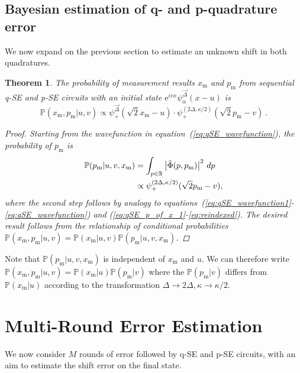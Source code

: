 \documentclass[prx,reprint,superscriptaddress,longbibliography,floatfix,nofootinbib]{revtex4-1}
\newtheorem{theorem}{Theorem}
\begin{document}
\subsection{Bayesian estimation of q- and p-quadrature error}
We now expand on the previous section to estimate an unknown shift in both quadratures.
\begin{theorem}
\label{result_proof_of_P_x_m_p_m_given_u_v} The probability of measurement results $x_\text{m}$ and $p_\text{m}$ from sequential q-SE and p-SE circuits with an initial state $\mathrm{e}^{ivx} \psi_{\alpha}^{\vec{\Delta}}(x-u)$ is 
\begin{equation*}
 \mathbb{P}(x_\mathrm{m},p_\mathrm{m}|u,v) \propto \psi^{\vec{\Delta}}_{+}(\sqrt{2}x_\text{m} - u) \cdot  \psi^{(2\Delta,\kappa/2)}_{+}(\sqrt{2}p_\text{m} - v) \ .
\label{eq:P_x_m_p_m_given_u_v}
\end{equation*}

\begin{proof}
Starting from the wavefunction in equation~(\ref{eq:qSE_wavefunction}), the probability of $p_\mathrm{m}$ is  
\begin{equation}\label{eq:qSE_p_of_x_1} 
\begin{split}
 \mathbb{P}(p_\text{m}|u,v,x_\mathrm{m}) &= \int_{p \in \mathbb{R}} \big{|} \tilde{\Phi}(p,p_\mathrm{m})\big{|}^2\ dp \\
 &\propto \psi^{(2\Delta,\kappa/2)}_{+}(\sqrt{2}p_\text{m} - v),
\end{split}
\end{equation}
where the second step follows by analogy to equations~(\ref{eq:qSE_wavefunction1}-\ref{eq:qSE_wavefunction}) and (\ref{eq:qSE_p_of_x_1}-\ref{eq:reindexed}). The desired result follows from the relationship of conditional probabilities $\mathbb{P}(x_\mathrm{m},p_\mathrm{m}|u,v) =\mathbb{P}(x_\mathrm{m}|u,v)\mathbb{P}(p_\mathrm{m}|u,v,x_\mathrm{m})$. 
\end{proof}
\end{theorem}
Note that $\mathbb{P}(p_\mathrm{m}|u,v,x_\mathrm{m})$ is independent of $x_\mathrm{m}$ and $u$. We can therefore write $\mathbb{P}(x_\mathrm{m},p_\mathrm{m}|u,v)=\mathbb{P}(x_\mathrm{m}|u)\mathbb{P}(p_\mathrm{m}|v)$ where the $\mathbb{P}(p_\mathrm{m}|v)$ differs from $\mathbb{P}(x_\mathrm{m}|u)$ according to the transformation $\Delta \rightarrow 2\Delta, \kappa \rightarrow \kappa/2$. 


\section{Multi-Round Error Estimation}
\label{appendix-multi-step}
We now consider $M$ rounds of error followed by q-SE and p-SE circuits, with an aim to estimate the shift error on the final state.
\end{document}
